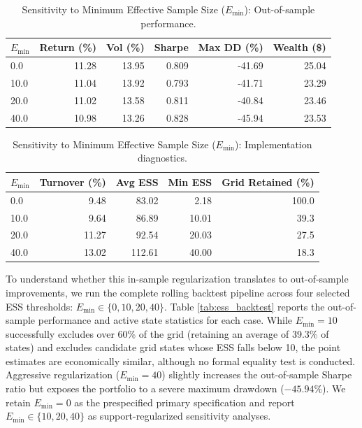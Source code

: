 \documentclass[smallextended]{svjour3}
\begin{document}
\begin{table}[htbp]
\centering
\caption{Sensitivity to Minimum Effective Sample Size ($E_{\min}$): Out-of-sample performance.}
\label{tab:ess_backtest_perf}
\begin{tabular}{lrrrrr}
\toprule
$E_{\min}$ & \textbf{Return (\%)} & \textbf{Vol (\%)} & \textbf{Sharpe} & \textbf{Max DD (\%)} & \textbf{Wealth (\$)} \\
\midrule
0.0 & 11.28 & 13.95 & 0.809 & -41.69 & 25.04 \\
10.0 & 11.04 & 13.92 & 0.793 & -41.71 & 23.29 \\
20.0 & 11.02 & 13.58 & 0.811 & -40.84 & 23.46 \\
40.0 & 10.98 & 13.26 & 0.828 & -45.94 & 23.53 \\
\bottomrule
\end{tabular}
\end{table}

\begin{table}[htbp]
\centering
\caption{Sensitivity to Minimum Effective Sample Size ($E_{\min}$): Implementation diagnostics.}
\label{tab:ess_backtest_diag}
\begin{tabular}{lrrrr}
\toprule
$E_{\min}$ & \textbf{Turnover (\%)} & \textbf{Avg ESS} & \textbf{Min ESS} & \textbf{Grid Retained (\%)} \\
\midrule
0.0 & 9.48 & 83.02 & 2.18 & 100.0 \\
10.0 & 9.64 & 86.89 & 10.01 & 39.3 \\
20.0 & 11.27 & 92.54 & 20.03 & 27.5 \\
40.0 & 13.02 & 112.61 & 40.00 & 18.3 \\
\bottomrule
\end{tabular}
\end{table}

To understand whether this in-sample regularization translates to out-of-sample improvements, we run the complete rolling backtest pipeline across four selected ESS thresholds: $E_{\min} \in \{0, 10, 20, 40\}$. Table \ref{tab:ess_backtest} reports the out-of-sample performance and active state statistics for each case. While $E_{\min}=10$ successfully excludes over 60\% of the grid (retaining an average of 39.3\% of states) and excludes candidate grid states whose ESS falls below 10, the point estimates are economically similar, although no formal equality test is conducted. Aggressive regularization ($E_{\min}=40$) slightly increases the out-of-sample Sharpe ratio but exposes the portfolio to a severe maximum drawdown ($-45.94\%$). We retain $E_{\min}=0$ as the prespecified primary specification and report $E_{\min}\in\{10,20,40\}$ as support-regularized sensitivity analyses.
\end{document}
